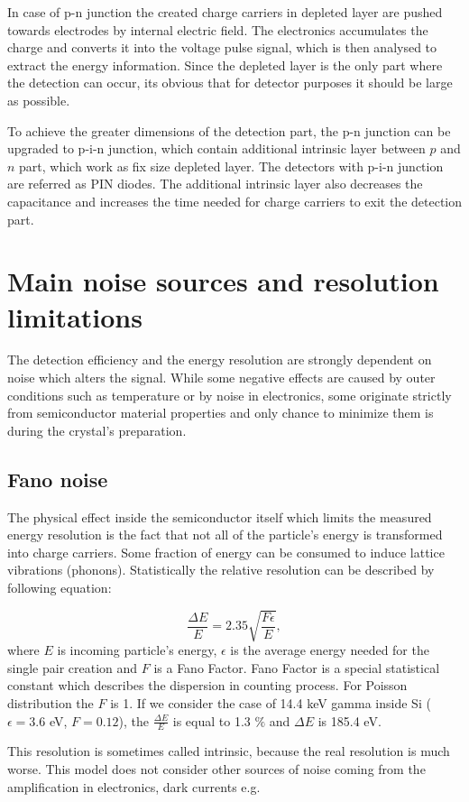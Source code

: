 \par
In case of p-n junction the created charge carriers in depleted layer are pushed towards electrodes by internal electric field. The  electronics accumulates the charge and converts it into the voltage pulse signal, which is then analysed to extract the energy information. Since the depleted layer is the only part where the detection can occur, its obvious that for detector purposes it should be large as possible. 
\par
To achieve the greater dimensions of the detection part, the p-n junction can be upgraded to p-i-n junction, which contain additional intrinsic layer between $p$ and $n$ part, which work as fix size depleted layer. The detectors with p-i-n junction are referred as PIN diodes. The additional intrinsic layer also decreases the capacitance and increases the time needed for charge carriers to exit the detection part.

\section{Main noise sources and resolution limitations}
The detection efficiency and the energy resolution are strongly dependent on noise which alters the signal. While some negative effects are caused by outer conditions such as temperature or by noise in electronics, some originate strictly from semiconductor material properties and only chance to minimize them is during the crystal's preparation.

\subsection{Fano noise}

The physical effect inside the semiconductor itself which limits the measured energy resolution is the fact that not all of the particle's energy is transformed into charge carriers. Some fraction of energy can be consumed to induce lattice vibrations (phonons). Statistically the relative resolution can be described by following equation:


\begin{equation}
\frac{\Delta E}{E} = 2.35\sqrt{\frac{F\epsilon}{E}},
\end{equation}
where $E$ is incoming particle's energy, $\epsilon$ is the average energy needed for the single pair creation and $F$ is a Fano Factor. Fano Factor is a special statistical constant which describes the dispersion in counting process. For Poisson distribution the $F$ is 1. If we consider the case of 14.4 keV gamma inside Si ($\epsilon = 3.6$ eV, $F = 0.12$), the $\frac{\Delta E}{E}$ is equal to 1.3 $\%$ and $\Delta E$ is 185.4 eV.
\par
This resolution is sometimes called intrinsic, because the real resolution is much worse. This model does not consider other sources of noise coming from the amplification in electronics, dark currents e.g. 




